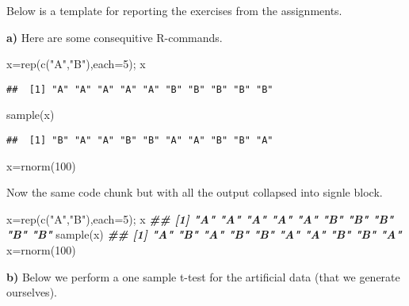 \documentclass[
  11pt,
]{article}
\newenvironment{Shaded}{\begin{snugshade}}{\end{snugshade}}
\newcommand{\AttributeTok}[1]{\textcolor[rgb]{0.77,0.63,0.00}{#1}}
\newcommand{\DecValTok}[1]{\textcolor[rgb]{0.00,0.00,0.81}{#1}}
\newcommand{\DocumentationTok}[1]{\textcolor[rgb]{0.56,0.35,0.01}{\textbf{\textit{#1}}}}
\newcommand{\FunctionTok}[1]{\textcolor[rgb]{0.00,0.00,0.00}{#1}}
\newcommand{\NormalTok}[1]{#1}
\newcommand{\OtherTok}[1]{\textcolor[rgb]{0.56,0.35,0.01}{#1}}
\newcommand{\StringTok}[1]{\textcolor[rgb]{0.31,0.60,0.02}{#1}}
\begin{document}
Below is a template for reporting the exercises from the assignments.

\textbf{a)} Here are some consequitive R-commands.

\begin{Shaded}
\begin{Highlighting}[]
\NormalTok{x}\OtherTok{=}\FunctionTok{rep}\NormalTok{(}\FunctionTok{c}\NormalTok{(}\StringTok{"A"}\NormalTok{,}\StringTok{"B"}\NormalTok{),}\AttributeTok{each=}\DecValTok{5}\NormalTok{); x}
\end{Highlighting}
\end{Shaded}

\begin{verbatim}
##  [1] "A" "A" "A" "A" "A" "B" "B" "B" "B" "B"
\end{verbatim}

\begin{Shaded}
\begin{Highlighting}[]
\FunctionTok{sample}\NormalTok{(x)}
\end{Highlighting}
\end{Shaded}

\begin{verbatim}
##  [1] "B" "A" "A" "B" "B" "A" "A" "B" "B" "A"
\end{verbatim}

\begin{Shaded}
\begin{Highlighting}[]
\NormalTok{x}\OtherTok{=}\FunctionTok{rnorm}\NormalTok{(}\DecValTok{100}\NormalTok{)}
\end{Highlighting}
\end{Shaded}

Now the same code chunk but with all the output collapsed into signle
block.

\begin{Shaded}
\begin{Highlighting}[]
\NormalTok{x}\OtherTok{=}\FunctionTok{rep}\NormalTok{(}\FunctionTok{c}\NormalTok{(}\StringTok{"A"}\NormalTok{,}\StringTok{"B"}\NormalTok{),}\AttributeTok{each=}\DecValTok{5}\NormalTok{); x}
\DocumentationTok{\#\#  [1] "A" "A" "A" "A" "A" "B" "B" "B" "B" "B"}
\FunctionTok{sample}\NormalTok{(x)}
\DocumentationTok{\#\#  [1] "A" "B" "A" "B" "B" "A" "A" "B" "B" "A"}
\NormalTok{x}\OtherTok{=}\FunctionTok{rnorm}\NormalTok{(}\DecValTok{100}\NormalTok{)}
\end{Highlighting}
\end{Shaded}

\textbf{b)} Below we perform a one sample t-test for the artificial data
(that we generate ourselves).
\end{document}
